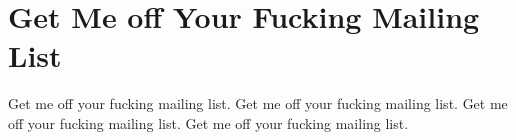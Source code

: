 \documentclass{jsarticle}
\begin{document}
  \section{Get Me off Your Fucking Mailing List}
  \noindent
    Get me off your fucking mailing list.
    Get me off your fucking mailing list.
    Get me off your fucking mailing list.
    Get me off your fucking mailing list.
  \par
\end{document}
